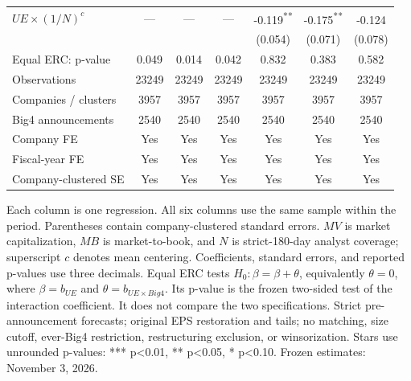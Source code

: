 \documentclass[10pt]{article}
\newcommand{\sym}[1]{\textsuperscript{#1}}
\begin{document}
\begin{tabular*}{\textwidth}{@{\extracolsep{\fill}}lcccccc@{}}
\(UE\times(1/N)^c\) & --- & --- & --- & -0.119\sym{**} & -0.175\sym{**} & -0.124\sym{} \\
 &  &  &  & (0.054) & (0.071) & (0.078) \\
\midrule
Equal ERC: p-value & 0.049 & 0.014 & 0.042 & 0.832 & 0.383 & 0.582 \\
Observations & 23249 & 23249 & 23249 & 23249 & 23249 & 23249 \\
Companies / clusters & 3957 & 3957 & 3957 & 3957 & 3957 & 3957 \\
Big4 announcements & 2540 & 2540 & 2540 & 2540 & 2540 & 2540 \\
Company FE & Yes & Yes & Yes & Yes & Yes & Yes \\
Fiscal-year FE & Yes & Yes & Yes & Yes & Yes & Yes \\
Company-clustered SE & Yes & Yes & Yes & Yes & Yes & Yes \\
\bottomrule\end{tabular*}\par\medskip
\noindent\footnotesize Each column is one regression. All six columns use the same sample within the period. Parentheses contain company-clustered standard errors. \(MV\) is market capitalization, \(MB\) is market-to-book, and \(N\) is strict-180-day analyst coverage; superscript \(c\) denotes mean centering. Coefficients, standard errors, and reported p-values use three decimals. Equal ERC tests \(H_0:\beta=\beta+\theta\), equivalently \(\theta=0\), where \(\beta=b_{UE}\) and \(\theta=b_{UE\times Big4}\). Its p-value is the frozen two-sided test of the interaction coefficient. It does not compare the two specifications. Strict pre-announcement forecasts; original EPS restoration and tails; no matching, size cutoff, ever-Big4 restriction, restructuring exclusion, or winsorization. Stars use unrounded p-values: *** p<0.01, ** p<0.05, * p<0.10. Frozen estimates: November 3, 2026.
\end{document}
